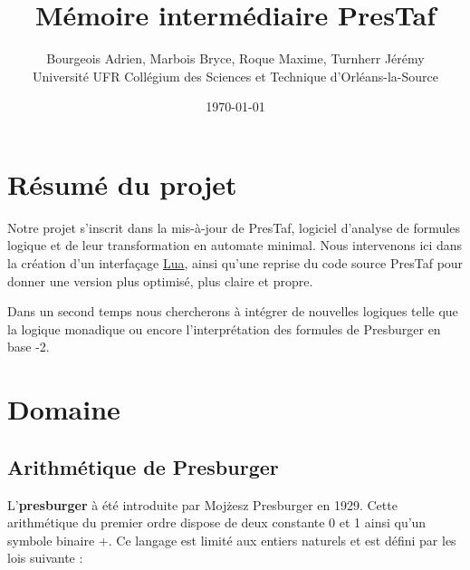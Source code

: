 \documentclass{article}%
\begin{document}
\title{Mémoire intermédiaire PresTaf}


\author{Bourgeois Adrien, Marbois Bryce, Roque Maxime, Turnherr Jérémy%
\\Université UFR Collégium des Sciences et Technique d'Orléans-la-Source}
\date{\today}
\maketitle



\clearpage

\tableofcontents

\cleardoublepage

\section{Résumé du projet}

Notre projet s'inscrit dans la mis-à-jour de PresTaf, logiciel d'analyse de formules logique et de leur transformation en automate minimal. Nous intervenons ici dans la création d'un interfaçage \href{https://fr.wikipedia.org/wiki/Lua}{Lua}, ainsi qu'une reprise du code source PresTaf pour donner une version plus optimisé, plus claire et propre.\\\par

Dans un second temps nous chercherons à intégrer de nouvelles logiques telle que la logique monadique ou encore l'interprétation des formules de Presburger en base -2.

\section{Domaine}


\subsection{Arithmétique de Presburger}

L'\textbf{\gls{presburger}} à été introduite par Moj\.{z}esz Presburger en 1929. Cette arithmétique du premier ordre dispose de deux constante 0 et 1 ainsi qu'un symbole binaire +. Ce langage est limité aux entiers naturels et est défini par les lois suivante :
\end{document}

